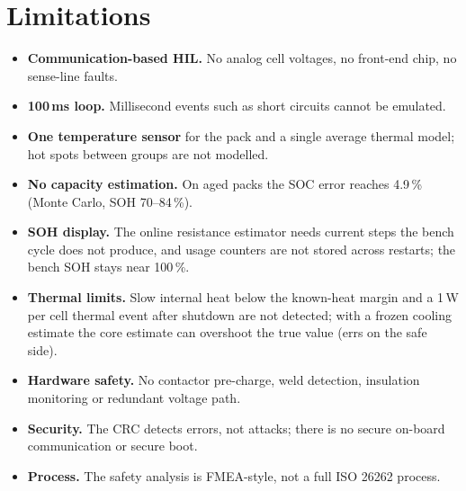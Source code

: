 \section{Limitations}
\begin{itemize}
  \item \textbf{Communication-based HIL.} No analog cell voltages, no front-end chip, no sense-line faults.
  \item \textbf{100\,ms loop.} Millisecond events such as short circuits cannot be emulated.
  \item \textbf{One temperature sensor} for the pack and a single average thermal model; hot spots between groups are not modelled.
  \item \textbf{No capacity estimation.} On aged packs the SOC error reaches 4.9\,\% (Monte Carlo, SOH 70--84\,\%).
  \item \textbf{SOH display.} The online resistance estimator needs current steps the bench cycle does not produce, and usage counters are not stored across restarts; the bench SOH stays near 100\,\%.
  \item \textbf{Thermal limits.} Slow internal heat below the known-heat margin and a 1\,W per cell thermal event after shutdown are not detected; with a frozen cooling estimate the core estimate can overshoot the true value (errs on the safe side).
  \item \textbf{Hardware safety.} No contactor pre-charge, weld detection, insulation monitoring or redundant voltage path.
  \item \textbf{Security.} The CRC detects errors, not attacks; there is no secure on-board communication or secure boot.
  \item \textbf{Process.} The safety analysis is FMEA-style, not a full ISO 26262 process.
\end{itemize}

